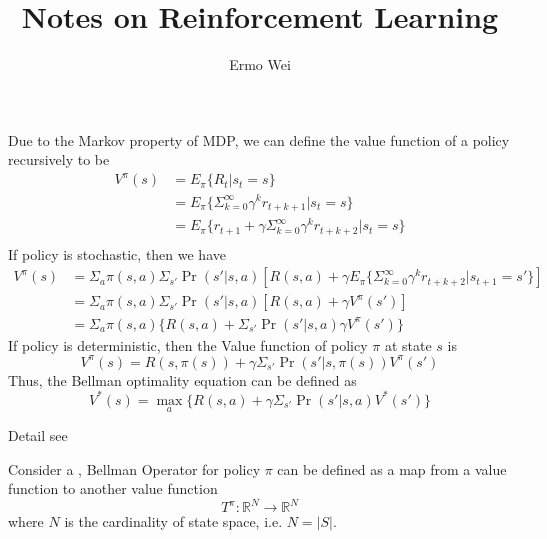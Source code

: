 \documentclass[9pt]{article}
\begin{document}
\title{Notes on Reinforcement Learning}
\author{Ermo Wei}
\date{}

\maketitle

\tableofcontents
\hypersetup{colorlinks=blue}

\clearpage 



 \Working

 Due to the Markov property of MDP, we can define the value function of a policy recursively to be 
\begin{displaymath}
  \begin{split}
    V^{\pi}(s) & = E_{\pi}\{R_t|s_t=s\}\\
    & = E_{\pi}\{\Sigma_{k=0}^{\infty}{\gamma^{k}r_{t+k+1}}|s_t = s\}\\
    & = E_{\pi}\{r_{t+1}+\gamma \Sigma_{k=0}^{\infty}{\gamma^{k}r_{t+k+2}}|s_t = s\}\\
  \end{split}
\end{displaymath}
If policy is stochastic, then we have
\begin{displaymath}
  \begin{split}
    V^{\pi}(s) & = \Sigma_{a}\pi(s,a)\Sigma_{s'}\Pr(s'|s,a)[R(s,a)+\gamma E_{\pi}\{\Sigma_{k=0}^{\infty}\gamma^{k}r_{t+k+2}|s_{t+1}=s'\}]\\
    & = \Sigma_{a}\pi(s,a)\Sigma_{s'}\Pr(s'|s,a)[R(s,a)+\gamma V^{\pi}(s')]\\
    & = \Sigma_{a}\pi(s,a)\{R(s,a)+\Sigma_{s'}\Pr(s'|s,a)\gamma V^{\pi}(s')\}
  \end{split}
\end{displaymath}
If policy is deterministic, then the Value function of policy $\pi$ at state $s$ is
\begin{displaymath}
  V^{\pi}(s) = R(s,\pi(s))+\gamma \Sigma_{s'}\Pr(s'|s,\pi(s))V^{\pi}(s')
\end{displaymath}
Thus, the Bellman optimality equation can be defined as
\begin{displaymath}
  V^{*}(s) = \max_a \{R(s,a)+\gamma \Sigma_{s'}\Pr(s'|s,a)V^{*}(s')\}
\end{displaymath}

Detail see \cite{barto1998reinforcement}

 Consider a , Bellman Operator for policy $\pi$ can be defined as a map from a value function to another value function
\begin{displaymath}
  T^\pi:\mathbb{R}^N \rightarrow \mathbb{R}^N
\end{displaymath}
where $N$ is the cardinality of state space, i.e. $N = |S|$.
\end{document}
